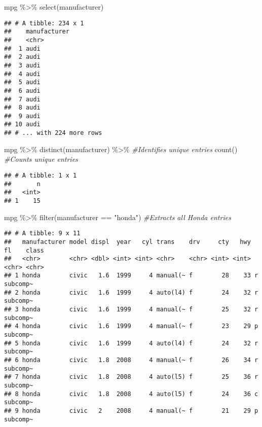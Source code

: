 \documentclass[
]{article}
\newenvironment{Shaded}{\begin{snugshade}}{\end{snugshade}}
\newcommand{\CommentTok}[1]{\textcolor[rgb]{0.56,0.35,0.01}{\textit{#1}}}
\newcommand{\FunctionTok}[1]{\textcolor[rgb]{0.00,0.00,0.00}{#1}}
\newcommand{\NormalTok}[1]{#1}
\newcommand{\SpecialCharTok}[1]{\textcolor[rgb]{0.00,0.00,0.00}{#1}}
\newcommand{\StringTok}[1]{\textcolor[rgb]{0.31,0.60,0.02}{#1}}
\begin{document}
\begin{Shaded}
\begin{Highlighting}[]
\NormalTok{mpg }\SpecialCharTok{\%\textgreater{}\%} 
  \FunctionTok{select}\NormalTok{(manufacturer)}
\end{Highlighting}
\end{Shaded}

\begin{verbatim}
## # A tibble: 234 x 1
##    manufacturer
##    <chr>       
##  1 audi        
##  2 audi        
##  3 audi        
##  4 audi        
##  5 audi        
##  6 audi        
##  7 audi        
##  8 audi        
##  9 audi        
## 10 audi        
## # ... with 224 more rows
\end{verbatim}

\begin{Shaded}
\begin{Highlighting}[]
\NormalTok{mpg }\SpecialCharTok{\%\textgreater{}\%}
  \FunctionTok{distinct}\NormalTok{(manufacturer) }\SpecialCharTok{\%\textgreater{}\%}  \CommentTok{\#Identifies unique entries}
  \FunctionTok{count}\NormalTok{()                     }\CommentTok{\#Counts unique entries}
\end{Highlighting}
\end{Shaded}

\begin{verbatim}
## # A tibble: 1 x 1
##       n
##   <int>
## 1    15
\end{verbatim}

\begin{Shaded}
\begin{Highlighting}[]
\NormalTok{mpg }\SpecialCharTok{\%\textgreater{}\%}
  \FunctionTok{filter}\NormalTok{(manufacturer }\SpecialCharTok{==} \StringTok{"honda"}\NormalTok{) }\CommentTok{\#Extracts all \textquotesingle{}Honda\textquotesingle{} entries}
\end{Highlighting}
\end{Shaded}

\begin{verbatim}
## # A tibble: 9 x 11
##   manufacturer model displ  year   cyl trans    drv     cty   hwy fl    class   
##   <chr>        <chr> <dbl> <int> <int> <chr>    <chr> <int> <int> <chr> <chr>   
## 1 honda        civic   1.6  1999     4 manual(~ f        28    33 r     subcomp~
## 2 honda        civic   1.6  1999     4 auto(l4) f        24    32 r     subcomp~
## 3 honda        civic   1.6  1999     4 manual(~ f        25    32 r     subcomp~
## 4 honda        civic   1.6  1999     4 manual(~ f        23    29 p     subcomp~
## 5 honda        civic   1.6  1999     4 auto(l4) f        24    32 r     subcomp~
## 6 honda        civic   1.8  2008     4 manual(~ f        26    34 r     subcomp~
## 7 honda        civic   1.8  2008     4 auto(l5) f        25    36 r     subcomp~
## 8 honda        civic   1.8  2008     4 auto(l5) f        24    36 c     subcomp~
## 9 honda        civic   2    2008     4 manual(~ f        21    29 p     subcomp~
\end{verbatim}
\end{document}
